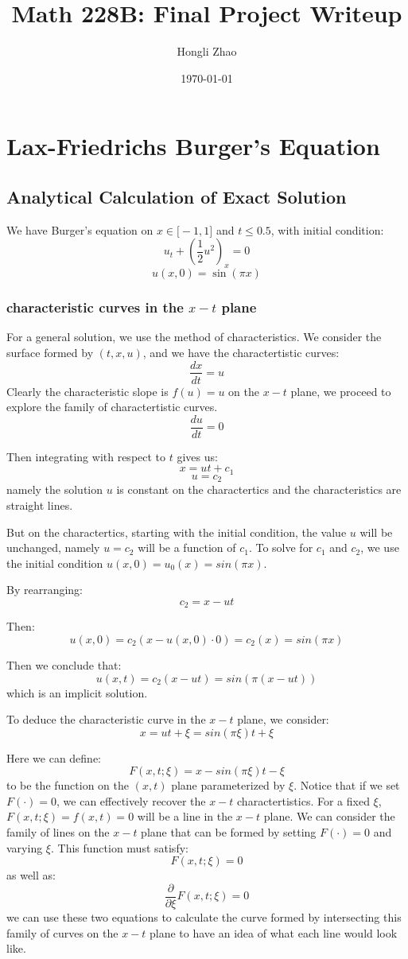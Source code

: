 \documentclass[12pt]{article} %
\author{Hongli Zhao}
\title{Math 228B: Final Project Writeup}
\date{\today}
\newcommand{\pdx}[1]{\frac{\partial}{\partial {#1}}}
\newcommand{\1}[1]{\mathds{1}\left[#1\right]}
\begin{document}
\maketitle
\section{Lax-Friedrichs Burger's Equation}
\subsection{Analytical Calculation of Exact Solution}
We have Burger's equation on $x\in\big[-1,1\big]$ and $t\le 0.5$, with initial condition:
$$
	u_t + (\frac{1}{2}u^2)_x = 0
$$
$$
	u(x,0) = \sin(\pi x)
$$

\subsubsection{characteristic curves in the $x-t$ plane}
For a general solution, we use the method of characteristics. We consider the surface formed by $(t,x,u)$, and we have the charactertistic curves:
$$
	\frac{dx}{dt} = u
$$
Clearly the characteristic slope is $f(u) = u$ on the $x-t$ plane, we proceed to explore the family of charactertistic curves.
$$
	\frac{du}{dt} = 0
$$

Then integrating with respect to $t$ gives us:
$$
	x = ut + c_1
$$	
$$
	u = c_2
$$ namely the solution $u$ is constant on the charactertics and the characteristics are straight lines.

But on the charactertics, starting with the initial condition, the value $u$ will be unchanged, namely $u = c_2$ will be a function of $c_1$. To solve for $c_1$ and $c_2$, we use the initial condition $u(x,0)=u_0(x) = sin(\pi x)$.

By rearranging:
$$
	c_2 = x-ut
$$

Then:
$$
	u(x,0) = c_2(x-u(x,0)\cdot 0)= c_2(x) = sin(\pi x)
$$

Then we conclude that:
$$
	u(x,t) = c_2(x-ut) = sin(\pi(x-ut))
$$ which is an implicit solution.

To deduce the characteristic curve in the $x-t$ plane, we consider:
$$
	x = ut + \xi = sin(\pi \xi)t + \xi
$$

Here we can define:
$$
	F(x,t;\xi) = x-sin(\pi\xi)t - \xi
$$ to be the function on the $(x,t)$ plane parameterized by $\xi$. Notice that if we set $F(\cdot)=0$, we can effectively recover the $x-t$ charactertistics. For a fixed $\xi$, $F(x,t;\xi)=f(x,t)=0$ will be a line in the $x-t$ plane. We can consider the family of lines on the $x-t$ plane that can be formed by setting $F(\cdot)=0$ and varying $\xi$. This function must satisfy:
$$
	F(x,t;\xi) = 0
$$ as well as:
$$
	\pdx{\xi}F(x,t;\xi) = 0
$$ we can use these two equations to calculate the curve formed by intersecting this family of curves on the $x-t$ plane to have an idea of what each line would look like.
\end{document}

